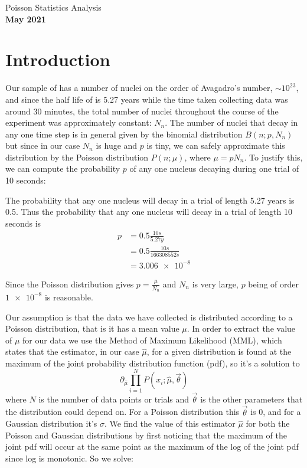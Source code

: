 \documentclass[12pt]{article}
\numberwithin{equation}{section}
\numberwithin{figure}{section}
\numberwithin{table}{section}
\begin{document}
\begin{center}
    {\huge Poisson Statistics Analysis}\\
    \vspace{0.2in}
    \textbf{May 2021}

\end{center}

\section{Introduction}\label{sec:Introduction}
\par Our sample of  has a number of nuclei on the order of Avagadro's number, $\sim 10^{23}$, and since the half life of  is 5.27 years \cite{manual} while the time taken collecting data was around 30 minutes, the total number of nuclei throughout the course of the experiment was approximately constant: $N_n$. The number of nuclei that decay in any one time step is in general given by the binomial distribution $B(n;p,N_n)$ but since in our case $N_n$ is huge and $p$ is tiny, we can safely approximate this distribution by the Poisson distribution $P(n;\mu)$, where $\mu=pN_n$. To justify this, we can compute the probability $p$ of any one nucleus decaying during one trial of 10 seconds:
\par The probability that any one nucleus will decay in a trial of length 5.27 years is 0.5. Thus the probability that any one nucleus will decay in a trial of length 10 seconds is
\begin{align*}
    p&=0.5\frac{10s}{5.27y}\\
    &=0.5\frac{10s}{166308552s}\\
    &=\num{3.006e-8}
\end{align*}
\par Since the Poisson distribution gives $p=\frac{\mu}{N_n}$ and $N_n$ is very large, $p$ being of order $\num{1e-8}$ is reasonable. 
\par Our assumption is that the data we have collected is distributed according to a Poisson distribution, that is it has a mean value $\mu$. In order to extract the value of $\mu$ for our data we use the Method of Maximum Likelihood (MML), which states that the estimator, in our case $\hat\mu$, for a given distribution is found at the maximum of the joint probability distribution function (pdf), so it's a solution to 
\begin{equation}
    \partial_{\hat\mu}\prod_{i=1}^N P(x_i;\hat\mu,\vec{\theta})
    \label{eqn:Joint PDF}
\end{equation}
where $N$ is the number of data points or trials and $\vec{\theta}$ is the other parameters that the distribution could depend on. For a Poisson distribution this $\vec{\theta}$ is 0, and for a Gaussian distribution it's $\sigma$. We find the value of this estimator $\hat\mu$ for both the Poisson and Gaussian distributions by first noticing that the maximum of the joint pdf will occur at the same point as the maximum of the log of the joint pdf since log is monotonic. So we solve:
\end{document}
